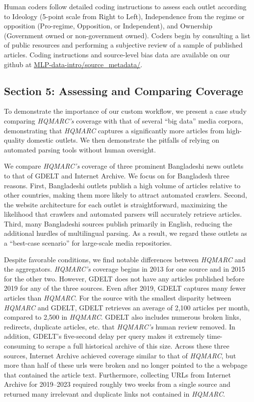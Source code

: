 \documentclass[
  letterpaper,
  DIV=11,
  numbers=noendperiod]{scrartcl}
\begin{document}
Human coders follow detailed coding instructions to assess each outlet
according to Ideology (5-point scale from Right to Left), Independence
from the regime or opposition (Pro-regime, Opposition, or Independent),
and Ownership (Government owned or non-government owned). Coders begin
by consulting a list of public resources and performing a subjective
review of a sample of published articles. Coding instructions and
source-level bias data are available on our github at
\href{https://github.com/ML4PDevLab/MLP-data-intro/tree/main/source_metadata}{MLP-data-intro/source\_metadata/}.

\subsection{Section 5: Assessing and Comparing
Coverage}\label{section-5-assessing-and-comparing-coverage}

To demonstrate the importance of our custom workflow, we present a case
study comparing \emph{HQMARC's} coverage with that of several ``big
data'' media corpora, demonstrating that \emph{HQMARC} captures a
significantly more articles from high-quality domestic outlets. We then
demonstrate the pitfalls of relying on automated parsing tools without
human oversight.

We compare \emph{HQMARC's} coverage of three prominent Bangladeshi news
outlets to that of GDELT and Internet Archive. We focus on for
Bangladesh three reasons. First, Bangladeshi outlets publish a high
volume of articles relative to other countries, making them more likely
to attract automated crawlers. Second, the website architecture for each
outlet is straightforward, maximizing the likelihood that crawlers and
automated parsers will accurately retrieve articles. Third, many
Bangladeshi sources publish primarily in English, reducing the
additional hurdles of multilingual parsing. As a result, we regard these
outlets as a ``best-case scenario'' for large-scale media repositories.

Despite favorable conditions, we find notable differences between
\emph{HQMARC} and the aggregators. \emph{HQMARC's} coverage begins in
2013 for one source and in 2015 for the other two. However, GDELT does
not have any articles published before 2019 for any of the three
sources. Even after 2019, GDELT captures many fewer articles than
\emph{HQMARC}. For the source with the smallest disparity between
\emph{HQMARC} and GDELT, GDELT retrieves an average of 2,100 articles
per month, compared to 2,500 in \emph{HQMARC}. GDELT also includes
numerous broken links, redirects, duplicate articles, etc. that
\emph{HQMARC's} human review removed. In addition, GDELT's five-second
delay per query makes it extremely time-consuming to scrape a full
historical archive of this size. Across these three sources, Internet
Archive achieved coverage similar to that of \emph{HQMARC}, but more
than half of these urls were broken and no longer pointed to the a
webpage that contained the article text. Furthermore, collecting URLs
from Internet Archive for 2019--2023 required roughly two weeks from a
single source and returned many irrelevant and duplicate links not
contained in \emph{HQMARC}.
\end{document}
